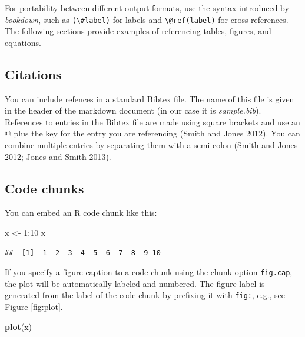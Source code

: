 \documentclass[9pt,a4paper,]{extarticle}
\newenvironment{Shaded}{\begin{snugshade}}{\end{snugshade}}
\newcommand{\KeywordTok}[1]{\textcolor[rgb]{0.13,0.29,0.53}{\textbf{{#1}}}}
\newcommand{\DecValTok}[1]{\textcolor[rgb]{0.00,0.00,0.81}{{#1}}}
\newcommand{\StringTok}[1]{\textcolor[rgb]{0.31,0.60,0.02}{{#1}}}
\newcommand{\NormalTok}[1]{{#1}}
\begin{document}
For portability between different output formats, use the syntax
introduced by \emph{bookdown}, such as
\texttt{(\textbackslash{}\#label)} for labels and
\texttt{\textbackslash{}@ref(label)} for cross-references. The following
sections provide examples of referencing tables, figures, and equations.

\subsection{Citations}\label{citations}

You can include refences in a standard Bibtex file. The name of this
file is given in the header of the markdown document (in our case it is
\emph{sample.bib}). References to entries in the Bibtex file are made
using square brackets and use an @ plus the key for the entry you are
referencing (Smith and Jones 2012). You can combine multiple entries by
separating them with a semi-colon (Smith and Jones 2012; Jones and Smith
2013).

\subsection{Code chunks}\label{code-chunks}

You can embed an R code chunk like this:

\begin{Shaded}
\begin{Highlighting}[]
\NormalTok{x <-}\StringTok{ }\DecValTok{1}\NormalTok{:}\DecValTok{10}
\NormalTok{x}
\end{Highlighting}
\end{Shaded}

\begin{verbatim}
##  [1]  1  2  3  4  5  6  7  8  9 10
\end{verbatim}

If you specify a figure caption to a code chunk using the chunk option
\texttt{fig.cap}, the plot will be automatically labeled and numbered.
The figure label is generated from the label of the code chunk by
prefixing it with \texttt{fig:}, e.g., see Figure \ref{fig:plot}.

\begin{Shaded}
\begin{Highlighting}[]
\KeywordTok{plot}\NormalTok{(x)}
\end{Highlighting}
\end{Shaded}
\end{document}
